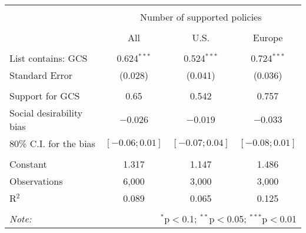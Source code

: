 
\begin{tabular}{@{\extracolsep{5pt}}lccc} 
\\[-1.8ex]\hline 
\hline \\[-1.8ex] 
 & \multicolumn{3}{c}{Number of supported policies} \\ 
\cline{2-4} 
\\[-1.8ex] & All & U.S. & Europe \\ 
\hline \\[-1.8ex] 
 List contains: GCS & 0.624$^{***}$ & 0.524$^{***}$ & 0.724$^{***}$ \\ 
 Standard Error & (0.028) & (0.041) & (0.036) \\ 
\hline  \\[-1.8ex] Support for GCS & 0.65  &  0.542  &  0.757 \\
Social desirability bias & \textit{$ -0.026 $} & \textit{$ -0.019 $} & \textit{$ -0.033 $}\\
80\% C.I. for the bias & \textit{ $[ -0.06 ; 0.01 ]$ } & \textit{ $[ -0.07 ; 0.04 ]$} & \textit{ $[ -0.08 ; 0.01 ]$}\\
 \hline \\[-1.8ex] 
Constant & 1.317 & 1.147 & 1.486 \\ 
Observations & 6,000 & 3,000 & 3,000 \\ 
R$^{2}$ & 0.089 & 0.065 & 0.125 \\ 
\hline 
\hline \\[-1.8ex] 
\textit{Note:}  & \multicolumn{3}{r}{$^{*}$p$<$0.1; $^{**}$p$<$0.05; $^{***}$p$<$0.01} \\ 
\end{tabular} 